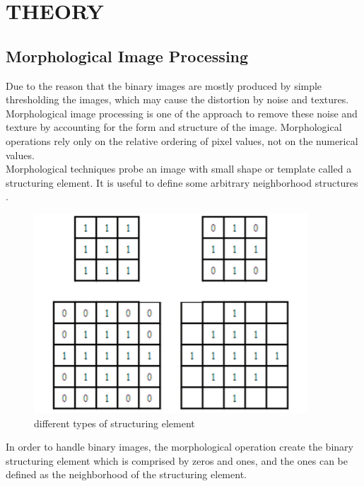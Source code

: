 \documentclass[a4paper,twoside]{article}
\begin{document}
\section{\uppercase{Theory}}
\subsection{Morphological Image Processing}
Due to the reason that the binary images are mostly produced by simple thresholding the images, which may cause the distortion by noise and textures. Morphological image processing is one of the approach to remove these noise and texture by accounting for the form and structure of the image. Morphological operations rely only on the relative ordering of pixel values, not on the numerical values.\\
Morphological techniques probe an image with small shape or template called a structuring element. It is useful to define some arbitrary neighborhood structures \cite{ravi2013morphological}.
\begin{figure}[!h]
  \centering
  \includegraphics[width=0.8\columnwidth]{Latex/imgs/structelement.PNG}
  \caption{different types of structuring element}
  \label{fig:structelement}
 \end{figure}
In order to handle binary images, the morphological operation create the binary structuring element which is comprised by zeros and ones, and the ones can be defined as the neighborhood of the structuring element.
\end{document}
